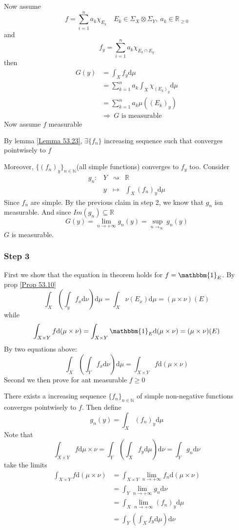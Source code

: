 \documentclass{book}
\begin{document}
Now assume $$f=\sum\limits_{i=1}^na_k\chi_{E_k}\quad E_k\in \Sigma_X\otimes\Sigma_Y,\ a_k\in \mathbb{R}_{\geq0}$$
and $$f_y=\sum\limits_{i=1}^na_k\chi_{E_k\cap E_y}$$
then
$$
\begin{aligned}
    G(y) &=\int_Xf_y\text{d}\mu\\
    &=\sum\limits_{k=1}^na_k\int_X\chi_{(E_k)_y}\text{d}\mu\\
    &=\sum\limits_{k=1}^na_k\mu((E_k)_y)\\
    &\Rightarrow\ G\text{ is measurable}
\end{aligned}
$$
Now assume $f$ measurable

By lemma \ref{Lemma 53.23}, $\exists \{f_n\}$ increasing
sequence such that converges pointwisely to $f$

Moreover, $\{(f_n)_y\}_{n\in \mathbb{N}}$(all simple functions) converges to $f_y$ too. Consider
$$\begin{aligned}
    g_n: &Y &\rightsquigarrow &\mathbb{R}\\
    &y & \mapsto &\int_X(f_n)_y\text{d}\mu
\end{aligned}$$
Since $f_n$ are simple. By the previous claim in step 2, we know that $g_n$ isn measurable. And since $Im(g_n)\subseteq\mathbb{R}$$$G(y)=\lim\limits_{n\rightarrow+\infty}g_n(y)=\sup\limits_{n\rightarrow_\infty}g_n(y)$$
$G$ is measurable.
\subsubsection{Step 3}
First we show that the equation in theorem holds for $f=\mathbbm{1}_E$. By prop \ref{Prop 53.10}
$$\int_X(\int_y f_x\text{d}\nu)\text{d}\mu=\int_X\nu(E_x)\text{d}\mu=(\mu\times\nu)(E)$$
while
$$\int_{X\times Y}f\text{d}(\mu\times\nu)=\int_{X\times Y}\mathbbm{1}_E\text{d}(\mu\times\nu)=(\mu\times\nu)(E)$$
By two equations above:
$$\int_X(\int_Yf_x\text{d}\nu)\text{d}\mu=\int_{X\times Y}f\text{d}(\mu\times\nu)$$
Second we then prove for ant measurable $f\geq 0$

There exists a increasing sequence $\{f_n\}_{n\in \mathbb{N}}$ of simple non-negative functions converges pointwisely to $f$. Then define
$$g_n(y)=\int_X(f_n)_y\text{d}\mu$$
Note that
$$\int_{X\times Y}f\text{d}\mu\times \nu=\int_Y(\int_Xf_y\text{d}\mu)\text{d}\nu=\int_Yg_n\text{d}\nu$$
take the limits
$$\begin{aligned}
    \int_{X\times Y}f\text{d}(\mu\times\nu)&=\int_{X\times Y}\lim\limits_{n\rightarrow+\infty}f_n\text{d}(\mu\times\nu)\\
    &=\int_Y\lim\limits_{n\rightarrow+\infty}g_n\text{d}\nu\\
    &=\int_X\lim\limits_{n\rightarrow+\infty}(f_n)_y\text{d}\mu\\
    &=\int_Y(\int_Xf_y\text{d}\mu)\text{d}\nu
\end{aligned}
$$
\end{document}
